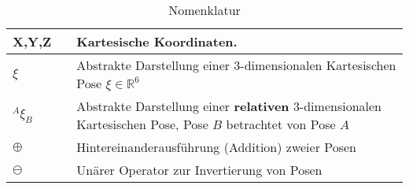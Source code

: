 \begin{table}[h]
\begin{tabularx}{\columnwidth}{|l|l|X|}
 	\hline X,Y,Z &   & Kartesische Koordinaten. \\
 	\hline $\xi$ &   & Abstrakte Darstellung einer 3-dimensionalen Kartesischen Pose  $\xi  \in \mathds{R}^6$ \\
 	\hline $^A\xi_B$ &   & Abstrakte Darstellung einer \textbf{relativen} 3-dimensionalen Kartesischen Pose, Pose $ B $ betrachtet von Pose $ A $ \\
	\hline $\oplus$ &   & Hintereinanderausführung (Addition) zweier Posen \\
	\hline $\ominus$ &   & Unärer Operator zur Invertierung von Posen \\
 	\hline
  \end{tabularx}
  \caption{Nomenklatur}
  \label{tab:nomenklatur}
  
    \end{table}%
  

